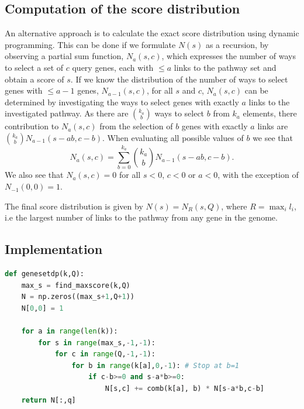 \documentclass[10pt,letterpaper]{article}
\begin{document}
\subsection*{Computation of the score distribution}

An alternative approach is to calculate the exact score distribution using dynamic programming. This can be done if we formulate $N(s)$ as a recursion, by observing a partial sum function,  $N_a(s,c)$,
 which expresses the number of ways to select a set of $c$ query genes, each with $\le a$  links to the pathway set and obtain a score of $s$. If we know the distribution of the number of ways to select genes with $\le a-1$ genes,  $N_{a-1}(s,c)$, for all $s$ and $c$,   $N_a(s,c)$ can be determined by investigating the ways to select genes with exactly $a$ links to the investigated pathway.   As there are $k_a \choose b$ ways to select $b$ from $k_a$ elements, there contribution to $N_a(s,c)$ from the selection of  $b$ genes with exactly $a$ links are ${k_a \choose b} N_{a-1}(s-ab,c-b)$. When evaluating all possible values of $b$ we see that
 \begin{equation}
N_a(s,c)=\sum_{b=0}^{k_a}{k_a \choose b} N_{a-1}(s-ab,c-b).
\end{equation}
We also see that $N_a(s,c)=0$ for all $s<0$, $c<0$ or $a<0$, with the exception of $N_{-1}(0,0)=1$.

The final score distribution is given by $N(s)=N_R(s,Q)$, where $R=\max_{i}{l_i}$, i.e the largest number of links to the pathway from any gene in the genome.


\subsection*{Implementation}

\begin{lstlisting}[language=Python, caption={ The central part of the dynamic programing algorithm for finding $N(s)$. The function takes the vector of links per gene, $k_a$, as well as the number of query genes, $Q$ as an input. The function depends on two additional functions {\tt find\_maxscore(k,Q)}, which calculates the maximal score a query of size $Q$ can obtain, and {\tt comb(a,b)}, which calculates $ a \choose b $.}, label=lst:gensetdp, captionpos=t, float, abovecaptionskip=-\medskipamount]
def genesetdp(k,Q):
    max_s = find_maxscore(k,Q)
    N = np.zeros((max_s+1,Q+1))
    N[0,0] = 1

    for a in range(len(k)):
        for s in range(max_s,-1,-1):
            for c in range(Q,-1,-1):
                for b in range(k[a],0,-1): # Stop at b=1
                    if c-b>=0 and s-a*b>=0:
                        N[s,c] += comb(k[a], b) * N[s-a*b,c-b]
    return N[:,q]
\end{lstlisting}
\end{document}
